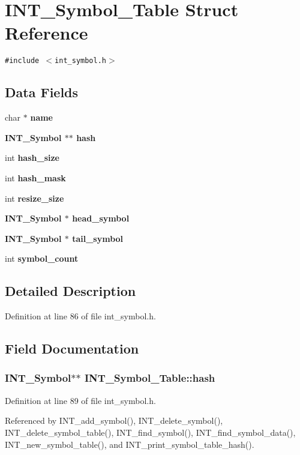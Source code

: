 \section{INT\_\-Symbol\_\-Table Struct Reference}
\label{structINT__Symbol__Table}
{\tt \#include $<$int\_\-symbol.h$>$}

\subsection*{Data Fields}
\begin{CompactItemize}
\item 
char $\ast$ \bf{name}
\item 
\bf{INT\_\-Symbol} $\ast$$\ast$ \bf{hash}
\item 
int \bf{hash\_\-size}
\item 
int \bf{hash\_\-mask}
\item 
int \bf{resize\_\-size}
\item 
\bf{INT\_\-Symbol} $\ast$ \bf{head\_\-symbol}
\item 
\bf{INT\_\-Symbol} $\ast$ \bf{tail\_\-symbol}
\item 
int \bf{symbol\_\-count}
\end{CompactItemize}


\subsection{Detailed Description}




Definition at line 86 of file int\_\-symbol.h.

\subsection{Field Documentation}
\subsubsection{\setlength{\rightskip}{0pt plus 5cm}\bf{INT\_\-Symbol}$\ast$$\ast$ \bf{INT\_\-Symbol\_\-Table::hash}}\label{structINT__Symbol__Table_b3518892fadbb47057f8c50fdf7fb530}




Definition at line 89 of file int\_\-symbol.h.

Referenced by INT\_\-add\_\-symbol(), INT\_\-delete\_\-symbol(), INT\_\-delete\_\-symbol\_\-table(), INT\_\-find\_\-symbol(), INT\_\-find\_\-symbol\_\-data(), INT\_\-new\_\-symbol\_\-table(), and INT\_\-print\_\-symbol\_\-table\_\-hash().

